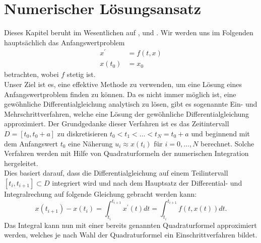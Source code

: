 \section{Numerischer Lösungsansatz}
\label{sec:numerict}
Dieses Kapitel beruht im Wesentlichen auf \cite{peterdeuflhardfolkmarbornemannNumerischeMathematikGewohnliche},
\cite{ernsthairergerhardwannerSolvingOrdinaryDifferential} und \cite{prof.dr.josefstoerNumerischeMathematik}. Wir
werden uns im Folgenden hauptsächlich das
Anfangswertproblem
\begin{align}
    \label{first-order-num}
    x^{\prime} &= f(t,x) \nonumber \\
    x(t_0) &= x_0
\end{align}
betrachten, wobei $f$ stetig ist.\\
Unser Ziel ist es, eine effektive Methode zu verwenden, um eine Lösung eines Anfangswertproblem finden zu können.
Da es nicht immer möglich ist, eine gewöhnliche Differentialgleichung analytisch zu lösen, gibt es sogenannte Ein- und
Mehrschrittverfahren, welche  eine Lösung der gewöhnliche Differentialgleichung approximiert.
Der Grundgedanke dieser Verfahren ist es das Zeitintervall $D=[t_0,t_{0}+a]$ zu diskretisieren
$t_0 < t_1 < \dots < t_N = t_{0}+a$ und beginnend mit dem Anfangswert $t_0$ eine Näherung $u_i \approx x(t_i)$ für
$i=0, \dots, N$ berechnet. Solche Verfahren werden mit Hilfe von Quadraturformeln der numerischen Integration
\cite[Numerische Integration]{walzLexikonMathematik} hergeleitet.\\
Dies basiert darauf, dass die Differentialgleichung auf einem Teilintervall $[t_i, t_{i+1}] \subset D$
integriert wird und nach dem Hauptsatz der Differential- und Integralrechung auf folgende Gleichung gebracht werden kann:
\[
    x(t_{i+1}) - x(t_i) = \int_{t_i}^{t_{i+1}} x^{\prime}(t)dt = \int_{t_i}^{t_{i+1}}f(t, x(t))dt.
\]
Das Integral kann nun mit einer bereits genannten Quadraturformel approximiert werden, welches je nach Wahl der
Quadraturformel ein Einschrittverfahren bildet.
